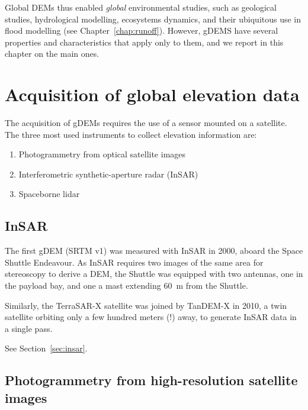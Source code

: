 Global DEMs thus enabled \emph{global} environmental studies, such as geological studies, hydrological modelling, ecosystems dynamics, and their ubiquitous use in flood modelling (see Chapter~\ref{chap:runoff}).
However, gDEMS have several properties and characteristics that apply only to them, and we report in this chapter on the main ones.



%
\section[Acquisition of global data]{Acquisition of global elevation data}

The acquisition of gDEMs requires the use of a sensor mounted on a satellite.
The three most used instruments to collect elevation information are:

\begin{enumerate}
  \item Photogrammetry from optical satellite images
  \item Interferometric synthetic-aperture radar (InSAR)
  \item Spaceborne lidar
\end{enumerate}

\subsection{InSAR}

The first gDEM (SRTM v1) was measured with InSAR in 2000, aboard the Space Shuttle Endeavour.
As InSAR requires two images of the same area for stereoscopy to derive a DEM, the Shuttle was equipped with two antennas, one in the payload bay, and one a mast extending \qty{60}{m} from the Shuttle.

Similarly, the TerraSAR-X satellite was joined by TanDEM-X in 2010, a twin satellite orbiting only a few hundred meters (!) away, to generate InSAR data in a single pass.

See Section~\ref{sec:insar}.

\subsection{Photogrammetry from high-resolution satellite images}

